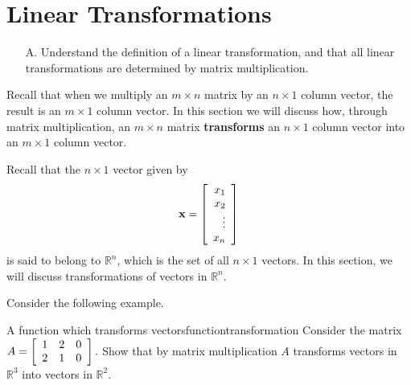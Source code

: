 \section{Linear Transformations}

\begin{outcome}
\begin{enumerate}
\item[A.]  Understand the definition of a linear transformation, and that all linear transformations are determined by matrix multiplication.
\end{enumerate}
\end{outcome}

Recall that when we multiply an $m\times n$ matrix by an $n\times 1 $
column vector, the result is an $m\times 1$ column vector. In this
section we will discuss how, through matrix multiplication, an $m
\times n$ matrix \textbf{transforms} an $n\times 1$ column vector into
an $m \times 1$ column vector.

Recall that the $n \times 1$ vector given by
\begin{equation*}
{\bf x} = 
\left[
\begin{array}{r}
x_1 \\
x_2\\ 
\vdots \\
x_n
\end{array}
\right]
\end{equation*}
is said to belong to $\mathbb{R}^n$, which is the set of all $n \times 1$ vectors. In this section, we will discuss transformations of vectors in $\mathbb{R}^n.$ 

Consider the following example. 

\begin{example}{A function which transforms vectors}{functiontransformation}
Consider the matrix $A = \left[
\begin{array}{ccc}
1 & 2 & 0 \\
2 & 1 & 0
\end{array}
\right] .$ 
Show that by matrix multiplication $A$ transforms vectors in $\mathbb{R}^3$ into vectors in $\mathbb{R}^2$.
\end{example}

